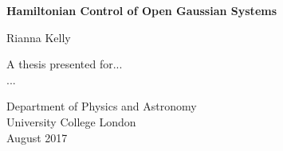 \documentclass[11pt,a4paper]{article}
\numberwithin{equation}{section}
\begin{document}
	\begin{titlepage}
		\begin{center}
			\vspace*{1cm}
			
			\textbf{\LARGE{Hamiltonian Control of Open Gaussian Systems}}
			
			\vspace{0.5cm}
			
			\large{Rianna Kelly}
			
			\vfill
			
			A thesis presented for...\\
			...
			
			\vspace{0.8cm}
			
			Department of Physics and Astronomy\\
			University College London\\
			August 2017
			
			\vspace{0.5\textheight}
			
		\end{center}
	\end{titlepage}
\end{document}
